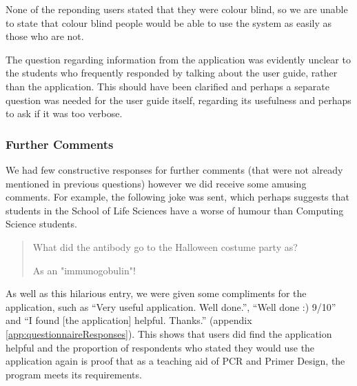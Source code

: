 None of the reponding users stated that they were colour blind, so we
are unable to state that colour blind people would be able to use the
system as easily as those who are not.

The question regarding information from the application was evidently
unclear to the students who frequently responded by talking about the
user guide, rather than the application.
This should have been clarified and perhaps a separate question was
needed for the user guide itself, regarding its usefulness and perhaps
to ask if it was too verbose.

\subsubsection{Further Comments}

We had few constructive responses for further comments (that were not
already mentioned in previous questions) however we did receive some
amusing comments.
For example, the following joke was sent, which perhaps suggests that
students in the School of Life Sciences have a worse of humour than
Computing Science students.
\begin{quote}
  What did the antibody go to the Halloween costume party as?

  As an "immunogobulin"!
\end{quote}

As well as this hilarious entry, we were given some compliments for
the application, such as ``Very useful application. Well done.'',
``Well done :) 9/10'' and ``I found [the application]
helpful. Thanks.'' (appendix \ref{app:questionnaireResponses}).
This shows that users did find the application helpful and the
proportion of respondents who stated they would use the application
again is proof that as a teaching aid of PCR and Primer Design, the
program meets its requirements.




